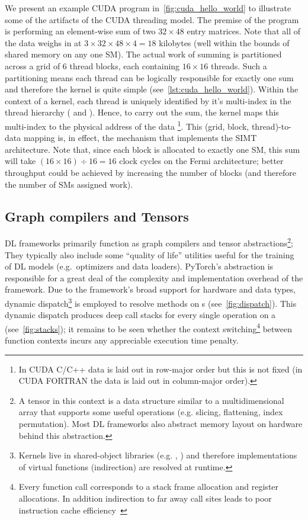 We present an example CUDA program in~\cref{fig:cuda_hello_world} to illustrate some of the artifacts of the CUDA threading model.
The premise of the program is performing an element-wise sum of two $32 \times 48$ entry matrices.
Note that all of the data weighs in at  $3 \times 32 \times 48 \times 4 = 18$ kilobytes (well within the bounds of shared memory on any one SM).
The actual work of summing is partitioned across a grid of 6 thread blocks, each containing $16 \times 16$ threads.
Such a partitioning means each thread can be logically responsible for exactly one sum and therefore the kernel is quite simple (see~\cref{lst:cuda_hello_world}).
Within the context of a kernel, each thread is uniquely identified by it's multi-index in the thread hierarchy ( and ).
Hence, to carry out the sum, the kernel maps this multi-index to the physical address of the data%
\footnote{In CUDA C/C++ data is laid out in row-major order but this is not fixed (in CUDA FORTRAN the data is laid out in column-major order).}.
This (grid, block, thread)-to-data mapping is, in effect, the mechanism that implements the SIMT architecture.
Note that, since each block is allocated to exactly one SM, this sum will take $\left( 16 \times 16 \right) \div 16 = 16$ clock cycles on the Fermi architecture;
better throughput could be achieved by increasing the number of blocks (and therefore the number of SMs assigned work).



\subsection{Graph compilers and Tensors}\label{subsec:graph-compilers}

DL frameworks primarily function as graph compilers and tensor abstractions\footnote{A tensor in this context is a data structure similar to a multidimensional array that supports some useful operations (e.g. slicing, flattening, index permutation). Most DL frameworks also abstract memory layout on hardware behind this abstraction.};
They typically also include some ``quality of life'' utilities useful for the training of DL models (e.g.\ optimizers and data loaders).
PyTorch's  abstraction is responsible for a great deal of the complexity and implementation overhead of the framework.
Due to the framework's broad support for hardware and data types, dynamic dispatch\footnote{Kernels live in shared-object libraries (e.g. , ) and therefore implementations of virtual functions (indirection) are resolved at runtime.} is employed to resolve methods on s (see~\cref{fig:dispatch}).
This dynamic dispatch produces deep call stacks for every single operation on a  (see~\cref{fig:stacks}); it remains to be seen whether the context switching\footnote{Every function call corresponds to a stack frame allocation and register allocations. In addition indirection to far away call sites leads to poor instruction cache efficiency~\cite{10.5555/3314872.3314876}} between function contexts incurs any appreciable execution time penalty.

